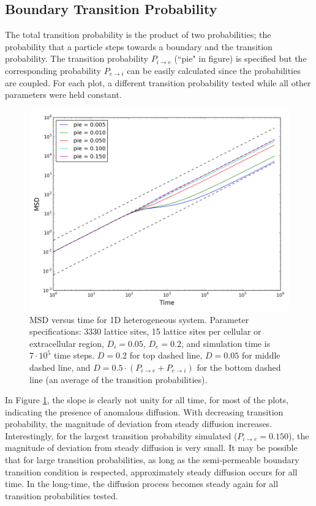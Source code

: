 \subsection{Boundary Transition Probability}
\label{sec:1D-boundary-transition-probability}
	The total transition probability is the product of two probabilities; the probability that a particle steps towards a boundary and the transition probability. The transition probability $ P_{i \rightarrow e} $ (``pie" in figure) is specified but the corresponding probability  $ P_{e \rightarrow i} $ can be easily calculated since the probabilities are coupled. For each plot, a different transition probability tested while all other parameters were held constant.
	
	\begin{figure}[h!]
		\centering
		\includegraphics[width=1.0\linewidth]{../images/1D/pie_msd_1D}
		\caption{MSD versus time for 1D heterogeneous system. Parameter specifications: 3330 lattice sites, 15 lattice sites per cellular or extracellular region, $ D_i = 0.05 $, $ D_e = 0.2 $, and simulation time is $ 7\cdot 10^5 $ time steps. $ D = 0.2 $ for top dashed line, $ D = 0.05 $ for middle dashed line, and $ D = 0.5 \cdot (P_{i \rightarrow e} + P_{e \rightarrow i}) $ for the bottom dashed line (an average of the transition probabilities).}
		\label{fig:pie_msd_1D}
	\end{figure}
	
	 In Figure \ref{fig:pie_msd_1D}, the slope is clearly not unity for all time, for most of the plots, indicating the presence of anomalous diffusion. With decreasing transition probability, the magnitude of deviation from steady diffusion increases. Interestingly, for the largest transition probability simulated ($ P_{i \rightarrow e} = 0.150 $), the magnitude of deviation from steady diffusion is very small. It may be possible that for large transition probabilities, as long as the semi-permeable boundary transition condition is respected, approximately steady diffusion occurs for all time. In the long-time, the diffusion process becomes steady again for all transition probabilities tested. 
	 
